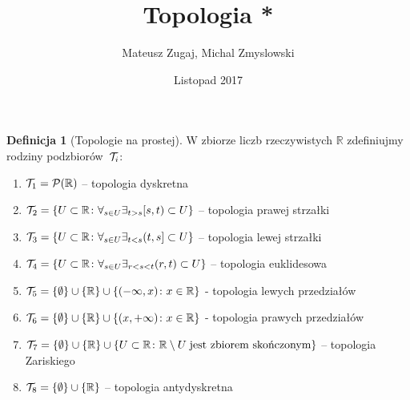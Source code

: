 \documentclass{article}
\title{Topologia *}
\author{Mateusz Zugaj, Michal Zmyslowski}
\date{Listopad 2017}
\theoremstyle{definition}%
\newtheorem{defn}{Definicja}
\theoremstyle{theorem}
\newcommand{\R}{\mathbb{R}} %
\newcommand{\Pow}{\mathcal{P}} %
\begin{document}
	
	\maketitle
	\begin{defn}[Topologie na prostej] W zbiorze liczb rzeczywistych  $\R$ zdefiniujmy rodziny podzbiorów~${\cal T}_i$:
		\begin{enumerate}
			\item ${\cal T}_1=\Pow (\R)$ -- topologia dyskretna
			\item ${\cal T}_2=\{U\subset \R\colon  \forall_{s\in U}\exists_{t>s}[s,t)\subset U\}$ -- topologia prawej strzałki
			\item ${\cal T}_3=\{U\subset \R\colon  \forall_{s\in U}\exists_{t<s}(t,s]\subset U\}$ -- topologia lewej strzałki
			\item ${\cal T}_4=\{U\subset \R\colon  \forall_{s\in U}\exists_{r<s<t}(r,t)\subset U\}$  -- topologia euklidesowa
			\item ${\cal T}_5=\{\emptyset\}\cup\{\R\}\cup\{(-\infty,x)\colon x\in \R\}$ - topologia lewych przedziałów
			\item ${\cal T}_6=\{\emptyset\}\cup\{\R\}\cup\{(x,+\infty)\colon x\in \R\}$ - topologia prawych przedziałów
			\item ${\cal T}_7=\{\emptyset\}\cup\{\R\}\cup\{U\subset \R\colon  \R\setminus U \; \hbox{jest zbiorem skończonym}\}$ -- topologia Zariskiego
			\item ${\cal T}_8=\{\emptyset\}\cup\{\R\}$ -- topologia antydyskretna
		\end{enumerate}
	\end{defn}
	
\end{document}
